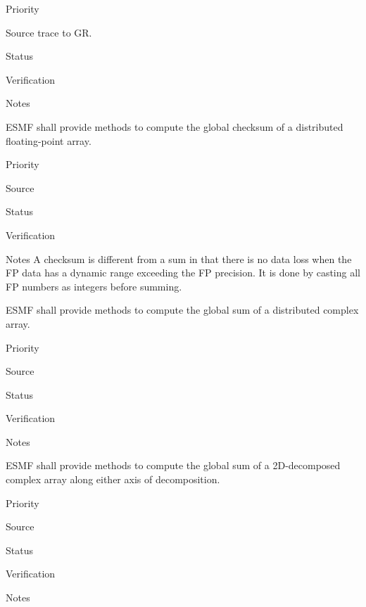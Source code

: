 \begin{reqlist}
\item[Priority]
\item[Source] trace to GR.
\item[Status]
\item[Verification]
\item[Notes]
\end{reqlist}


ESMF shall provide methods to compute the global checksum of a
distributed floating-point array. 

\begin{reqlist}
\item[Priority]
\item[Source]
\item[Status]
\item[Verification]
\item[Notes] A checksum is different from a sum in that there is no
  data loss when the FP data has a dynamic range exceeding the FP
  precision. It is done by casting all FP numbers as integers before
  summing.
\end{reqlist}


ESMF shall provide methods to compute the global sum of a distributed
complex array.

\begin{reqlist}
\item[Priority]
\item[Source]
\item[Status]
\item[Verification]
\item[Notes]
\end{reqlist}


ESMF shall provide methods to compute the global sum of a 2D-decomposed
complex array along either axis of decomposition.

\begin{reqlist}
\item[Priority]
\item[Source]
\item[Status]
\item[Verification]
\item[Notes]
\end{reqlist}


